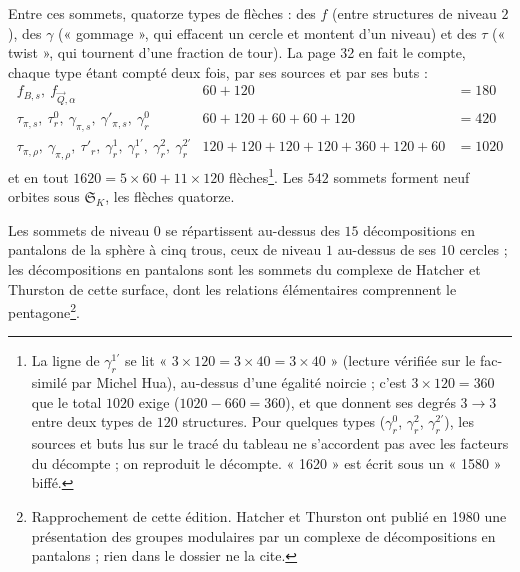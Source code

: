 \documentclass[11pt,a4paper]{article}
\begin{document}
Entre ces sommets, quatorze types de flèches : des $f$ (entre structures de
niveau $2$), des $\gamma$ (« gommage », qui effacent un cercle et montent d'un
niveau) et des $\tau$ (« twist », qui tournent d'une fraction de tour). La page
32 en fait le compte, chaque type étant compté deux fois, par ses sources et par
ses buts :
\[
\begin{array}{lll}
f_{B,s},\ f_{\vec{Q},\alpha} & 60 + 120 & = 180 \\
\tau_{\pi,s},\ \tau^{0}_{r},\ \gamma_{\pi,s},\ \gamma'_{\pi,s},\ \gamma^{0}_{r} &
60 + 120 + 60 + 60 + 120 & = 420 \\
\tau_{\pi,\rho},\ \gamma_{\pi,\rho},\ \tau'_{r},\ \gamma^{1}_{r},\
\gamma^{1\prime}_{r},\ \gamma^{2}_{r},\ \gamma^{2\prime}_{r} & 120 + 120 + 120 +
120 + 360 + 120 + 60 & = 1020
\end{array}
\]
et en tout $1620 = 5 \times 60 + 11 \times 120$ flèches\footnote{La ligne de
$\gamma^{1\prime}_r$ se lit « $3 \times 120 = 3 \times 40 = 3 \times 40$ »
(lecture vérifiée sur le fac-similé par Michel Hua), au-dessus d'une égalité noircie ; c'est $3 \times 120 = 360$ que le total $1020$
exige ($1020 - 660 = 360$), et que donnent ses degrés $3 \to 3$ entre deux types
de $120$ structures. Pour quelques types ($\gamma^{0}_r$, $\gamma^{2}_r$,
$\gamma^{2\prime}_r$), les sources et buts lus sur le tracé du tableau ne
s'accordent pas avec les facteurs du décompte ; on reproduit le décompte. « 1620 »
est écrit sous un « 1580 » biffé.}. Les $542$ sommets forment neuf orbites sous
$\mathfrak{S}_K$, les flèches quatorze.

Les sommets de niveau $0$ se répartissent au-dessus des $15$ décompositions
en pantalons de la sphère à cinq trous, ceux de niveau $1$ au-dessus de ses $10$
cercles ; les décompositions en pantalons sont les sommets du complexe de
Hatcher et Thurston de cette surface, dont les relations élémentaires
comprennent le pentagone\footnote{Rapprochement de cette édition. Hatcher et Thurston ont
publié en 1980 une présentation des groupes modulaires par un complexe de
décompositions en pantalons ; rien dans le dossier ne la cite.}.
\end{document}
